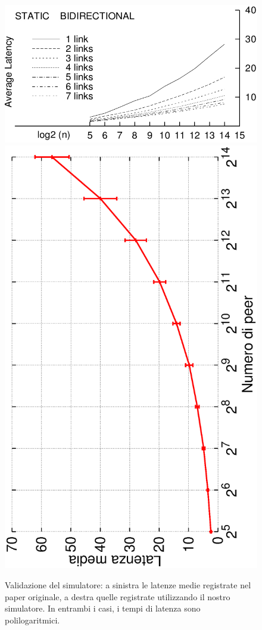 \documentclass[prodmode,acmtap]{acmlarge}
\begin{document}
\begin{figure}	
\centering
	\includegraphics[scale=.31]{imgs/join-reale.jpg}
\endminipage\hfill
{}
\centering
	\includegraphics[scale=.31, angle=-90]{imgs/join_cost.eps}
\endminipage\hfill
\caption{Validazione del simulatore: a sinistra le latenze medie registrate nel paper originale, a destra quelle registrate utilizzando il nostro simulatore. In entrambi i casi, i tempi di latenza sono polilogaritmici.}
\label{img:join-cost}
\end{figure}
\end{document}
